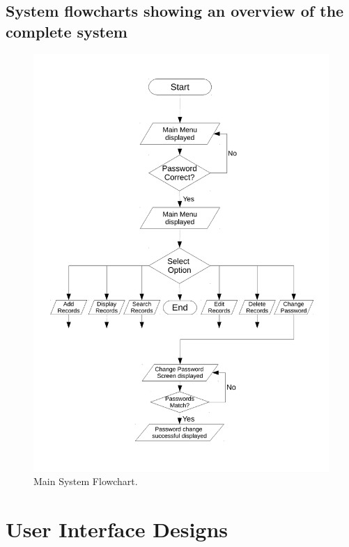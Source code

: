 \newpage

\subsection{System flowcharts showing an overview of the complete system}


\begin{figure}[H]
    \includegraphics[width=\textwidth]{./Design/system_flowcharts/PDFs/main_system_flowchart.pdf}
    \caption{Main System Flowchart.} \label{fig:print_function_result}
\end{figure}





\section{User Interface Designs}

